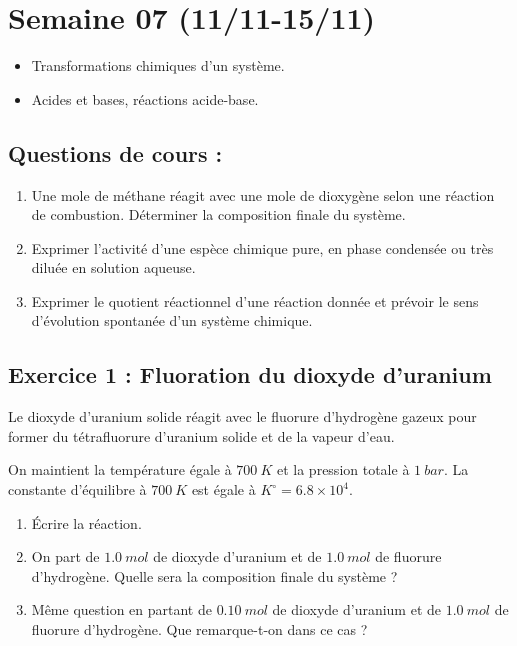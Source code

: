 \section{Semaine 07 (11/11-15/11) }


\begin{itemize}
	\item Transformations chimiques d'un système.
	\item Acides et bases, réactions acide-base.
\end{itemize}

\subsection{Questions de cours :}
\begin{enumerate}
	\item Une mole de méthane réagit avec une mole de dioxygène selon une réaction de combustion. Déterminer la composition finale du système.
	\item Exprimer l'activité d'une espèce chimique pure, en phase condensée ou très diluée en solution aqueuse.
	\item Exprimer le quotient réactionnel d'une réaction donnée et prévoir le sens d'évolution spontanée d'un système chimique.
\end{enumerate}

\subsection{Exercice 1 : Fluoration du dioxyde d'uranium}

Le dioxyde d'uranium solide réagit avec le fluorure d'hydrogène gazeux pour former du tétrafluorure d'uranium solide et de la vapeur d'eau. 

On maintient la température égale à $\SI{700}{K}$ et la pression totale à $\SI{1}{bar}$. La constante d'équilibre à $\SI{700}{K}$ est égale à $K^\circ = 6.8\times10^4$.

\begin{enumerate}
	\item Écrire la réaction.
	\item On part de $\SI{1.0}{mol}$ de dioxyde d'uranium et de $\SI{1.0}{mol}$ de fluorure d'hydrogène. Quelle sera la composition finale du système ?
	\item Même question en partant de $\SI{0.10}{mol}$ de dioxyde d'uranium et de $\SI{1.0}{mol}$ de fluorure d'hydrogène. Que remarque-t-on dans ce cas ?  
\end{enumerate}

